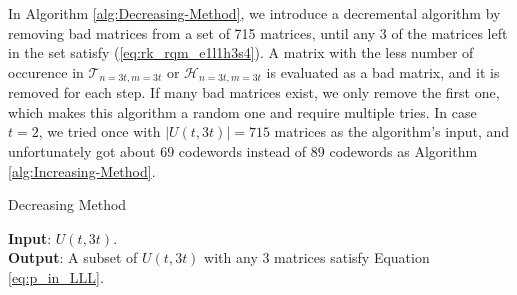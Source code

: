 In Algorithm \ref{alg:Decreasing-Method}, we introduce a decremental
algorithm by removing bad matrices from a set of 715 matrices, until
any 3 of the matrices left in the set satisfy (\ref{eq:rk_rqm_e1l1h3s4}).
A matrix with the less number of occurence in $\mathcal{T}_{n=3t,m=3t}$
or $\mathcal{H}_{n=3t,m=3t}$ is evaluated as a bad matrix, and it
is removed for each step. If many bad matrices exist, we only remove
the first one, which makes this algorithm a random one and require
multiple tries. In case $t=2$, we tried once with $\left|U\left(t,3t\right)\right|=715$
matrices as the algorithm's input, and unfortunately got about 69
codewords instead of 89 codewords as Algorithm \ref{alg:Increasing-Method}. 

\begin{algorithm}[H]
\caption{Decreasing Method \label{alg:Decreasing-Method}}

\hspace*{\algorithmicindent} \textbf{Input}: $U(t,3t)$. \\
\hspace*{\algorithmicindent} \textbf{Output}: A subset of $U(t,3t)$ with any 3 matrices satisfy Equation \ref{eq:p_in_LLL}. 
\begin{algorithmic}[1]
	\REPEAT
		\ENDIF
	\ENDFOR
\end{algorithmic}
\end{algorithm}

